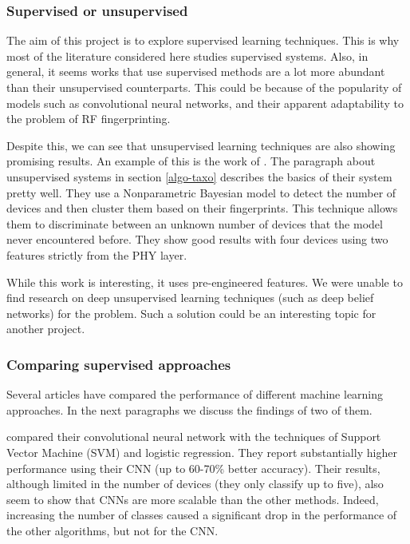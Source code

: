 \subsubsection{Supervised or unsupervised}

The aim of this project is to explore supervised learning techniques. This is why most of the literature considered here studies supervised systems. Also, in general, it seems works that use supervised methods are a lot more abundant than their unsupervised counterparts. This could be because of the popularity of models such as convolutional neural networks, and their apparent adaptability to the problem of RF fingerprinting.

Despite this, we can see that unsupervised learning techniques are also showing promising results. An example of this is the work of \textcite{nguyen_device_2011}. The paragraph about unsupervised systems in section \ref{algo-taxo} describes the basics of their system pretty well. They use a Nonparametric Bayesian model to detect the number of devices and then cluster them based on their fingerprints. This technique allows them to discriminate between an unknown number of devices that the model never encountered before. They show good results with four devices using two features strictly from the PHY layer.

While this work is interesting, it uses pre-engineered features. We were unable to find research on deep unsupervised learning techniques (such as deep belief networks) for the problem. Such a solution could be an interesting topic for another project.

\subsubsection{Comparing supervised approaches}

Several articles have compared the performance of different machine learning approaches. In the next paragraphs we discuss the findings of two of them.

\textcite{riyaz_deep_2018} compared their convolutional neural network with the techniques of Support Vector Machine (SVM) and logistic regression. They report substantially higher performance using their CNN (up to 60-70\% better accuracy). Their results, although limited in the number of devices (they only classify up to five), also seem to show that CNNs are more scalable than the other methods. Indeed, increasing the number of classes caused a significant drop in the performance of the other algorithms, but not for the CNN.


